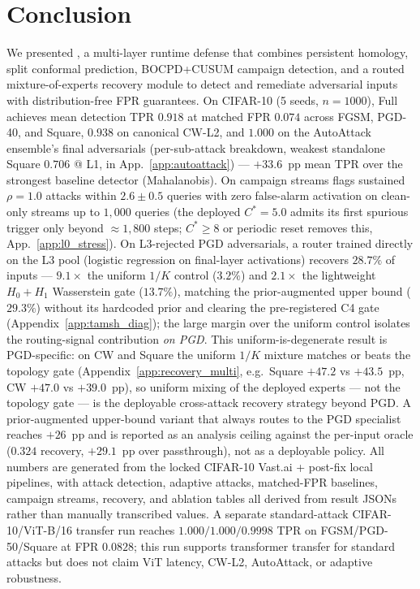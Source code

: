 \section{Conclusion}
\label{sec:conclusion}

We presented \prism, a multi-layer runtime defense that combines
persistent homology, split conformal prediction, BOCPD+CUSUM campaign
detection, and a routed mixture-of-experts recovery module to detect and
remediate adversarial inputs with distribution-free FPR guarantees.
On CIFAR-10 (5 seeds, $n{=}1000$), \prism Full achieves mean detection TPR
$0.918$ at matched FPR $0.074$ across FGSM, PGD-40, and Square, $0.938$ on
canonical CW-L2, and $1.000$ on the AutoAttack ensemble's final
adversarials (per-sub-attack breakdown, weakest standalone Square
$0.706$ @ L1, in App.~\ref{app:autoattack}) --- $+33.6$~pp mean TPR over the
strongest baseline detector (Mahalanobis). On campaign streams \sacd flags
sustained $\rho{=}1.0$ attacks within $2.6 \pm 0.5$ queries with zero
false-alarm activation on clean-only streams up to $1{,}000$ queries
(the deployed $C^*{=}5.0$ admits its first spurious trigger only beyond
$\approx 1{,}800$ steps; $C^*{\geq}8$ or periodic reset removes this,
App.~\ref{app:l0_stress}). On L3-rejected PGD
adversarials, a \tamsh router trained directly on the L3 pool (logistic
regression on final-layer activations) recovers $28.7\%$ of inputs ---
$9.1\times$ the uniform $1/K$ control ($3.2\%$) and $2.1\times$ the
lightweight $H_0{+}H_1$ Wasserstein gate ($13.7\%$), matching the
prior-augmented upper bound ($29.3\%$) without its hardcoded prior and
clearing the pre-registered C4 gate
(Appendix~\ref{app:tamsh_diag}); the large margin over the uniform
control isolates the routing-signal contribution \emph{on PGD}. This
uniform-is-degenerate result is PGD-specific: on CW and Square the
uniform $1/K$ mixture matches or beats the topology gate
(Appendix~\ref{app:recovery_multi}, e.g.\ Square $+47.2$ vs $+43.5$~pp,
CW $+47.0$ vs $+39.0$~pp), so uniform mixing of the deployed experts ---
not the topology gate --- is the deployable cross-attack recovery
strategy beyond PGD. A prior-augmented upper-bound variant that always
routes to the PGD specialist reaches $+26$~pp and is reported as an
analysis ceiling against the per-input oracle ($0.324$ recovery,
$+29.1$~pp over passthrough), not as a deployable policy. All numbers
are generated from the locked CIFAR-10 Vast.ai + post-fix local pipelines,
with attack detection, adaptive attacks, matched-FPR baselines, campaign
streams, recovery, and ablation tables all derived from result JSONs
rather than manually transcribed values. A separate standard-attack
CIFAR-10/ViT-B/16 transfer run reaches $1.000/1.000/0.9998$ TPR on
FGSM/PGD-50/Square at FPR $0.0828$; this run supports transformer
transfer for standard attacks but does not claim ViT latency, CW-L2,
AutoAttack, or adaptive robustness.


